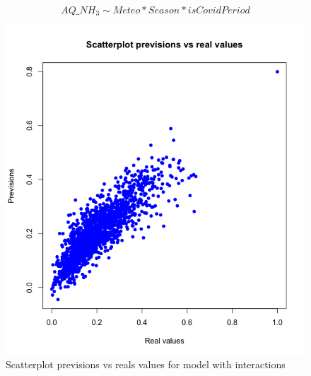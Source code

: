 \documentclass[10pt]{article} %
\begin{document}
    \begin{equation}
        AQ\_NH_3 \sim Meteo * Season * isCovidPeriod 
        \label{eq:seasonal_model} 
    \end{equation}
 \begin{figure}[h]
            \centering
            \includegraphics[scale=0.45]{Assets/Interaction1_result.png}
            \caption{Scatterplot previsions vs reals values for model with interactions}
            \label{fig:enter-label}
        \end{figure}
    
\end{document}
